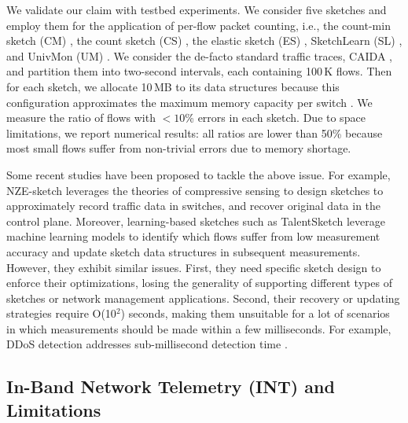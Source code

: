 
We validate our claim with testbed experiments. We consider five sketches and employ them for the application of per-flow packet counting, i.e., the count-min sketch (CM) \cite{cormode2005s}, the count sketch (CS) \cite{charikar2004finding}, the elastic sketch (ES) \cite{yang2018elastic}, SketchLearn (SL) \cite{huang2018sketchlearn}, and UnivMon (UM) \cite{liu2016one}. We consider the de-facto standard traffic traces, CAIDA \cite{caida}, and partition them into two-second intervals, each containing 100\,K flows. Then for each sketch, we allocate 10\,MB to its data structures because this configuration approximates the maximum memory capacity per switch \cite{gupta2018sonata}. 
We measure the ratio of flows with $<10$\% errors in each sketch. Due to space limitations, we report numerical results: all ratios are lower than 50\% because most small flows suffer from non-trivial errors due to memory shortage. 


Some recent studies have been proposed to tackle the above issue. For example, NZE-sketch \cite{huang2021toward} leverages the theories of compressive sensing to design sketches to approximately record traffic data in switches, and recover original data in the control plane. Moreover, learning-based sketches such as TalentSketch \cite{li2024learning} leverage machine learning models to identify which flows suffer from low measurement accuracy and update sketch data structures in subsequent measurements. However, they exhibit similar issues. First, they need specific sketch design to enforce their optimizations, losing the generality of supporting different types of sketches or network management applications. Second, their recovery or updating strategies require O(10$^2$) seconds, making them unsuitable for a lot of scenarios in which measurements should be made within a few milliseconds. For example, DDoS detection addresses sub-millisecond detection time \cite{liu2021jaqen}. 

\subsection{In-Band Network Telemetry (INT) and Limitations}\label{int}

